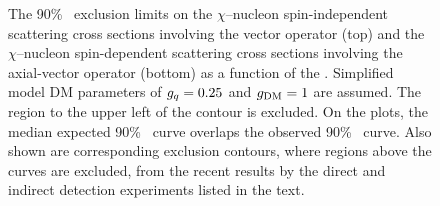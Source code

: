 \begin{figure}[htbp]
  \centering
  \caption{
    The 90\% \CL\ exclusion limits on the $\chi$--nucleon spin-independent scattering cross sections involving the vector operator (top) and the $\chi$--nucleon spin-dependent scattering cross sections involving the axial-vector operator (bottom) as a function of the \mdm.
    Simplified model DM parameters of $g_{{q}}=0.25$ and $g_{\text{DM}}=1$ are assumed.
    The region to the upper left of the contour is excluded. 
    On the plots, the median expected 90\% \CL\ curve overlaps the observed 90\% \CL\ curve.
    Also shown are corresponding exclusion contours, where regions above the curves are excluded, from the recent results by the direct and indirect detection experiments listed in the text.
    }
    \label{fig:limits_direct}
\end{figure}

